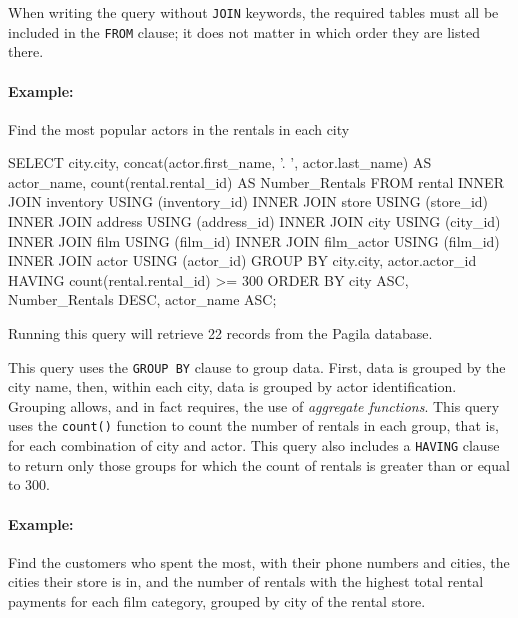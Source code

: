 When writing the query without \texttt{JOIN} keywords, the required tables must all be included in the \texttt{FROM} clause; it does not matter in which order they are listed there.

\paragraph{Example:} Find the most popular actors in the rentals in each city

\begin{samepage}
\begin{sqlcode}
SELECT city.city, 
       concat(actor.first_name, '. ', actor.last_name) AS actor_name,
       count(rental.rental_id) AS Number_Rentals
  FROM rental
  INNER JOIN inventory USING (inventory_id)
  INNER JOIN store USING (store_id)
  INNER JOIN address USING (address_id)
  INNER JOIN city USING (city_id)
  INNER JOIN film USING (film_id)
  INNER JOIN film_actor USING (film_id)
  INNER JOIN actor USING (actor_id)
  GROUP BY city.city, actor.actor_id
  HAVING count(rental.rental_id) >= 300
  ORDER BY city ASC, 
           Number_Rentals DESC, 
           actor_name ASC;
\end{sqlcode}
\end{samepage}

Running this query will retrieve 22 records from the Pagila database.

This query uses the \texttt{GROUP BY} clause to group data. First, data is grouped by the city name, then, within each city, data is grouped by actor identification. Grouping allows, and in fact requires, the use of \emph{aggregate functions}. This query uses the \texttt{count()} function to count the number of rentals in each group, that is, for each combination of city and actor. This query also includes a \texttt{HAVING} clause to return only those groups for which the count of rentals is greater than or equal to 300. 

\paragraph*{Example:} Find the customers who spent the most, with their phone numbers and cities, the cities their store is in, and the number of rentals with the highest total rental payments for each film category, grouped by city of the rental store.

